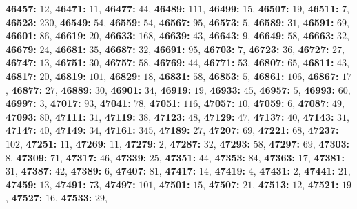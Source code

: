\textsf{\bfseries 46457:} $12$, \textsf{\bfseries 46471:} $11$, \textsf{\bfseries 46477:} $44$, \textsf{\bfseries 46489:} $111$, \textsf{\bfseries 46499:} $15$, \textsf{\bfseries 46507:} $19$, \textsf{\bfseries 46511:} $7$, \textsf{\bfseries 46523:} $230$, \textsf{\bfseries 46549:} $54$, \textsf{\bfseries 46559:} $54$, \textsf{\bfseries 46567:} $95$, \textsf{\bfseries 46573:} $5$, \textsf{\bfseries 46589:} $31$, \textsf{\bfseries 46591:} $69$, \textsf{\bfseries 46601:} $86$, \textsf{\bfseries 46619:} $20$, \textsf{\bfseries 46633:} $168$, \textsf{\bfseries 46639:} $43$, \textsf{\bfseries 46643:} $9$, \textsf{\bfseries 46649:} $58$, \textsf{\bfseries 46663:} $32$, \textsf{\bfseries 46679:} $24$, \textsf{\bfseries 46681:} $35$, \textsf{\bfseries 46687:} $32$, \textsf{\bfseries 46691:} $95$, \textsf{\bfseries 46703:} $7$, \textsf{\bfseries 46723:} $36$, \textsf{\bfseries 46727:} $27$, \textsf{\bfseries 46747:} $13$, \textsf{\bfseries 46751:} $30$, \textsf{\bfseries 46757:} $58$, \textsf{\bfseries 46769:} $44$, \textsf{\bfseries 46771:} $53$, \textsf{\bfseries 46807:} $65$, \textsf{\bfseries 46811:} $43$, \textsf{\bfseries 46817:} $20$, \textsf{\bfseries 46819:} $101$, \textsf{\bfseries 46829:} $18$, \textsf{\bfseries 46831:} $58$, \textsf{\bfseries 46853:} $5$, \textsf{\bfseries 46861:} $106$, \textsf{\bfseries 46867:} $17$, \textsf{\bfseries 46877:} $27$, \textsf{\bfseries 46889:} $30$, \textsf{\bfseries 46901:} $34$, \textsf{\bfseries 46919:} $19$, \textsf{\bfseries 46933:} $45$, \textsf{\bfseries 46957:} $5$, \textsf{\bfseries 46993:} $60$, \textsf{\bfseries 46997:} $3$, \textsf{\bfseries 47017:} $93$, \textsf{\bfseries 47041:} $78$, \textsf{\bfseries 47051:} $116$, \textsf{\bfseries 47057:} $10$, \textsf{\bfseries 47059:} $6$, \textsf{\bfseries 47087:} $49$, \textsf{\bfseries 47093:} $80$, \textsf{\bfseries 47111:} $31$, \textsf{\bfseries 47119:} $38$, \textsf{\bfseries 47123:} $48$, \textsf{\bfseries 47129:} $47$, \textsf{\bfseries 47137:} $40$, \textsf{\bfseries 47143:} $31$, \textsf{\bfseries 47147:} $40$, \textsf{\bfseries 47149:} $34$, \textsf{\bfseries 47161:} $345$, \textsf{\bfseries 47189:} $27$, \textsf{\bfseries 47207:} $69$, \textsf{\bfseries 47221:} $68$, \textsf{\bfseries 47237:} $102$, \textsf{\bfseries 47251:} $11$, \textsf{\bfseries 47269:} $11$, \textsf{\bfseries 47279:} $2$, \textsf{\bfseries 47287:} $32$, \textsf{\bfseries 47293:} $58$, \textsf{\bfseries 47297:} $69$, \textsf{\bfseries 47303:} $8$, \textsf{\bfseries 47309:} $71$, \textsf{\bfseries 47317:} $46$, \textsf{\bfseries 47339:} $25$, \textsf{\bfseries 47351:} $44$, \textsf{\bfseries 47353:} $84$, \textsf{\bfseries 47363:} $17$, \textsf{\bfseries 47381:} $31$, \textsf{\bfseries 47387:} $42$, \textsf{\bfseries 47389:} $6$, \textsf{\bfseries 47407:} $81$, \textsf{\bfseries 47417:} $14$, \textsf{\bfseries 47419:} $4$, \textsf{\bfseries 47431:} $2$, \textsf{\bfseries 47441:} $21$, \textsf{\bfseries 47459:} $13$, \textsf{\bfseries 47491:} $73$, \textsf{\bfseries 47497:} $101$, \textsf{\bfseries 47501:} $15$, \textsf{\bfseries 47507:} $21$, \textsf{\bfseries 47513:} $12$, \textsf{\bfseries 47521:} $19$, \textsf{\bfseries 47527:} $16$, \textsf{\bfseries 47533:} $29$, 
